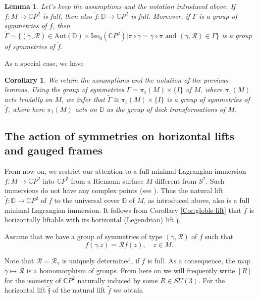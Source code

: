 \documentclass[a4paper,11pt]{amsart}
\newtheorem{corollary}[theorem]{Corollary}
\newtheorem{lemma}[theorem]{Lemma}
\theoremstyle{definition}
\numberwithin{equation}{section}
\newcommand{\C}{\mathbb{C}}
\newcommand{\D}{\mathbb{D}}
\newcommand{\f}{\mathfrak{f}}
\begin{document}
\begin{lemma}
Let's keep the assumptions and the notation introduced above. If  $f: M \rightarrow \mathbb{C}P^2$ is full, then also  $\tilde{f}: \D \rightarrow \mathbb{C}P^2$ is full.
Moreover, if $\Gamma$ is a group of symmetries of $f$, then 
$\tilde{\Gamma} = \{ (\tilde{\gamma}, \mathcal{R}) \in \mathrm{Aut}(\D)\times 
 \mathrm{Iso}_0(\mathbb{C}P^2) | \pi \circ \tilde{\gamma} = \gamma \circ \pi \text{ and }
  (\gamma, \mathcal{R})\in \Gamma \}$ 
  is a group of symmetries of  $\tilde{f}$.
\end{lemma}

As a special case, we have
\begin{corollary} \label{decktrafo}
We retain the assumptions and the notation of the previous lemmas.
Using the group of symmetries 
$\Gamma = \pi_1(M) \times \{I\}$ of $M$, where $\pi_1(M)$ acts trivially on $M$, we infer that $\tilde{\Gamma} \cong \pi_1(M) \times \{I\}$ is a group of symmetries of $\tilde{f}$, where here $\pi_1(M)$ acts on $\D$ as the group of deck transformations of $M$.
\end{corollary}


\subsection{The action of symmetries on horizontal lifts and
gauged frames}
\label{subsection: action of symmetries}

From now on, we restrict our attention to  a full minimal Lagrangian immersion $f:M \rightarrow \C P^2$  into $\C P^2$ from a Riemann surface $M$ different from $S^2$. 
Such immersions do not have any complex points (see \cite{DoMaB1}).
Thus the natural lift $\tilde{f}: \D\rightarrow \C P^2$ of $f$ to the universal cover $\D$ of $M$, as introduced above, 
also is a full minimal Lagrangian immersion. It follows from Corollary \ref{Cor:globle-lift} that $\tilde{f}$ 
is horizontally liftable  with its horizontal (Legendrian) lift $\tilde{\f}$. 

Assume that we have a group of symmetries of type $(\gamma, \mathcal{R})$ of $f$ 
such that
\begin{equation}
f(\gamma.z) = \mathcal{R} f(z), \quad z \in M.
\end{equation}

Note that  $\mathcal{R} =  \mathcal{R}_\gamma$ is uniquely determined, if $f$ is full.
As a consequence, the map $\gamma \mapsto \mathcal{R}$ is a homomorphism of groups.
From here on we will frequently write $[R]$ for the isometry of $\C P^2$ naturally induced
by some $R \in SU(3)$. 
For the horizontal lift $\tilde{\f}$   of the natural lift  $\tilde{f}$    we obtain 
\end{document}
